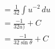\documentclass[preview]{standalone}
\begin{document}
\begin{align*}
&=\frac{1}{32} \int u^{-2} \, du \\ &=\frac{-1}{32u)}+C \\ &=\frac{-1}{32\sin\theta}+C
\end{align*}
\end{document}
